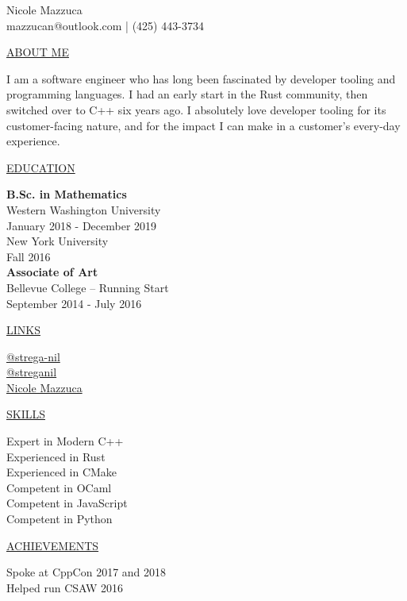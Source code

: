 \documentclass[11pt]{article}
\newcommand{\resumetitle}[3]{
  \AddToShipoutPictureBG{
    \AtPageUpperLeft {
    \raisebox{-0.09\paperheight}{
      \color{black!85}\rule{2\paperwidth}{\paperheight}}
    }}
  \begin{Center}
    \begingroup
    \titlethin
    \color{black!10}\Huge{#1}
    \titlethick
    \color{black!5}\Huge{#2} \\
    \vspace{2mm}
    \textrm{\color{black!15}\Large{#3}}
    \endgroup
  \end{Center}
  \vspace{7mm}
}
\newcommand{\betteruline}[1]{
  \uline{#1}
}
\newcommand{\sectiontitle}[1]{
  \begingroup
    \titlebold
    \betteruline{\Large\uppercase{#1}  }
    \vspace{1.7mm}
  \endgroup
}
\newcommand{\sectioncontent}[1]{
  \begingroup
    \begin{FlushLeft}
    \vspace{-3mm}
    \sffamily\small#1
    \end{FlushLeft}
  \endgroup
  \vspace{2mm}
}
\begin{document}
\resumetitle{Nicole}{Mazzuca} {
  mazzucan@outlook.com |
  (425) 443-3734
}

\setlength{\columnsep}{7mm}
\begin{paracol}{2}

\sectiontitle{about me}
\sectioncontent{
  I am a software engineer who has long been fascinated by developer tooling and programming languages.
  I had an early start in the Rust community, then switched over to C++ six years ago.
  I absolutely love developer tooling for its customer-facing nature,
  and for the impact I can make in a customer's every-day experience.
}

\sectiontitle{education}
\sectioncontent{
  \textbf{B.Sc. in Mathematics} \\
  Western Washington University \\
  \textcolor{black!70}{January 2018 - December 2019} \\
  New York University \\
  \textcolor{black!70}{Fall 2016} \\
  \textbf{Associate of Art} \\
  Bellevue College -- Running Start \\
  \textcolor{black!70}{September 2014 - July 2016}
}

\sectiontitle{links}
\sectioncontent{
  \hspace{2mm}
  \href{https://github.com/strega-nil}{@strega-nil} \\
  \faIcon{mastodon}\hspace{2mm}
  \href{https://mstdn.social/@streganil}{@streganil} \\
  \faIcon{linkedin-in}\hspace{2.1mm}
  \href{https://www.linkedin.com/in/nicole-mazzuca-18291472/}{Nicole Mazzuca} \\
}

\sectiontitle{skills}
\sectioncontent{
  Expert in Modern C++ \\
  Experienced in Rust \\
  Experienced in CMake \\
  Competent in OCaml \\
  Competent in JavaScript \\
  Competent in Python \\
}

\sectiontitle{achievements}
\sectioncontent{
  Spoke at CppCon 2017 and 2018 \\
  Helped run CSAW 2016 \\
}


\end{paracol}
\end{document}
